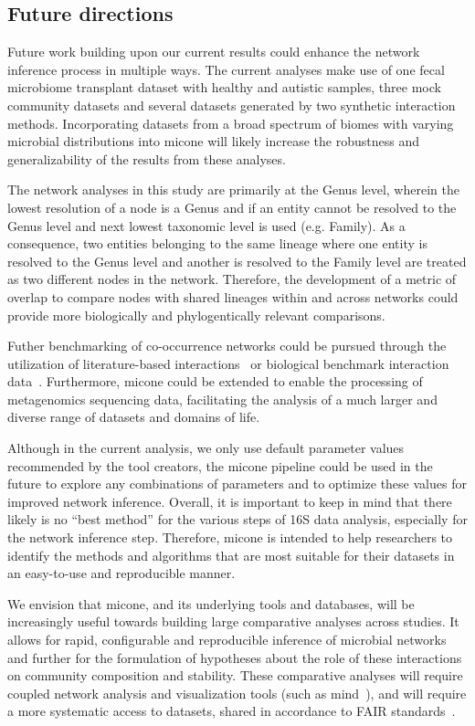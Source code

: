   \subsection*{Future directions}

  Future work building upon our current results could enhance the network inference process in multiple ways.
  The current analyses make use of one fecal microbiome transplant dataset with healthy and autistic samples, three mock community datasets and several datasets generated by two synthetic interaction methods.
  Incorporating datasets from a broad spectrum of biomes with varying microbial distributions into \ac{micone} will likely increase the robustness and generalizability of the results from these analyses.

  The network analyses in this study are primarily at the Genus level, wherein the lowest resolution of a node is a Genus and if an entity cannot be resolved to the Genus level and next lowest taxonomic level is used (e.g. Family).
  As a consequence, two entities belonging to the same lineage where one entity is resolved to the Genus level and another is resolved to the Family level are treated as two different nodes in the network.
  Therefore, the development of a metric of overlap to compare nodes with shared lineages within and across networks could provide more biologically and phylogentically relevant comparisons.

  Futher benchmarking of co-occurrence networks could be pursued through the utilization of literature-based interactions~\cite{lima-mendezDeterminantsCommunityStructure2015a} or biological benchmark interaction data~\cite{sungGlobalMetabolicInteraction2017a}.
  Furthermore, \ac{micone} could be extended to enable the processing of metagenomics sequencing data, facilitating the analysis of a much larger and diverse range of datasets and domains of life.

  Although in the current analysis, we only use default parameter values recommended by the tool creators, the \ac{micone} pipeline could be used in the future to explore any combinations of parameters and to optimize these values for improved network inference.
  Overall, it is important to keep in mind that there likely is no ``best method'' for the various steps of 16S data analysis, especially for the network inference step.
  Therefore, \ac{micone} is intended to help researchers to identify the methods and algorithms that are most suitable for their datasets in an easy-to-use and reproducible manner.

  We envision that \ac{micone}, and its underlying tools and databases, will be increasingly useful towards building large comparative analyses across studies.
  It allows for rapid, configurable and reproducible inference of microbial networks and further for the formulation of hypotheses about the role of these interactions on community composition and stability.
  These comparative analyses will require coupled network analysis and visualization tools (such as \ac{mind}~\cite{huResourceComparisonIntegration2022}), and will require a more systematic access to datasets, shared in accordance to FAIR standards~\cite{pachecoFAIRRepresentationsMicrobial2022}.

